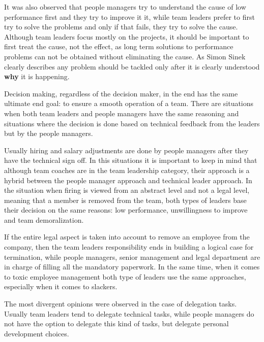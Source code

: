 It was also observed that people managers try to understand the cause of low performance first and they try to improve it it, while team leaders prefer to first try to solve the problems and only if that fails, they try to solve the cause. Although team leaders focus mostly on the projects, it should be important to first treat the cause, not the effect, as long term solutions to performance problems can not be obtained without eliminating the cause. As Simon Sinek clearly describes \cite{why} any problem should be tackled only after it is clearly understood \textbf{why} it is happening.

Decision making, regardless of the decision maker, in the end has the same ultimate end goal: to ensure a smooth operation of a team. There are situations when both team leaders and people managers have the same reasoning and situations where the decision is done based on technical feedback from the leaders but by the people managers.

 Usually hiring and salary adjustments are done by people managers after they have the technical sign off. In this situations it is important to keep in mind that although team coaches are in the team leadership category, their approach is a hybrid between the people manager approach and technical leader approach. In the situation when firing is viewed from an abstract level and not a legal level, meaning that a member is removed from the team, both types of leaders base their decision on the same reasons: low performance, unwillingness to improve and team demoralization. 
 
If the entire legal aspect is taken into account to remove an employee from the company, then the team leaders responsibility ends in building a logical case for termination, while people managers, senior management and legal department are in charge of filling all the mandatory paperwork. In the same time, when it comes to toxic employee management both type of leaders use the same approaches, especially when it comes to slackers.

The most divergent opinions were observed in the case of delegation tasks. Usually team leaders tend to delegate technical tasks, while people managers do not have the option to delegate this kind of tasks, but delegate personal development choices.
